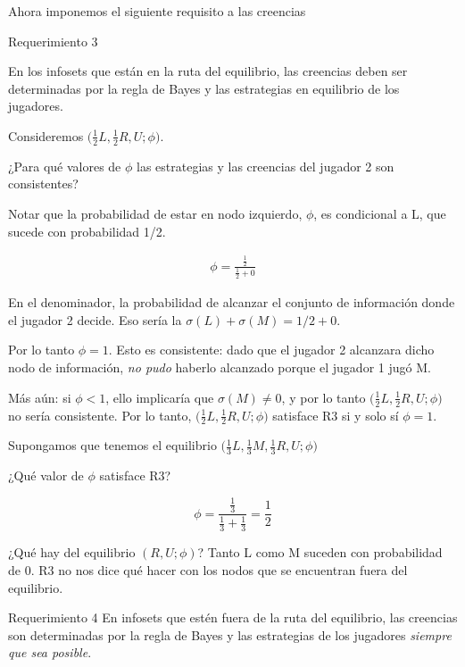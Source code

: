 \documentclass[12pt]{article}
\begin{document}
Ahora imponemos el siguiente requisito a las creencias

\begin{mybox}{Requerimiento 3}

	En los infosets que están en la ruta del equilibrio, las creencias deben ser determinadas por la regla de Bayes y las estrategias en equilibrio de los jugadores.

\end{mybox}

Consideremos $\biggl( \frac{1}{2}L, \frac{1}{2}R, U; \phi \biggr)$.

¿Para qué valores de $ \phi $ las estrategias y las creencias del jugador 2 son consistentes?

Notar que la probabilidad de estar en nodo izquierdo, $ \phi $, es condicional a L, que sucede con probabilidad 1/2.

\begin{align*}
	\phi = \frac{ \frac{1}{2} }{\frac{1}{2} + 0}
\end{align*}

En el denominador, la probabilidad de alcanzar el conjunto de información donde el jugador 2 decide. Eso sería la $ \sigma(L) + \sigma(M) = 1/2 + 0 $.

Por lo tanto $ \phi = 1$. Esto es consistente: dado que el jugador 2 alcanzara dicho nodo de información, \textit{no pudo} haberlo alcanzado porque el jugador 1 jugó M.

Más aún: si $ \phi < 1$, ello implicaría que $ \sigma(M) \neq 0 $, y por lo tanto $\biggl( \frac{1}{2}L, \frac{1}{2}R, U; \phi \biggr)$ no sería consistente. Por lo tanto, $\biggl( \frac{1}{2}L, \frac{1}{2}R, U; \phi \biggr)$ satisface R3 si y solo sí $ \phi = 1 $.

Supongamos que tenemos el equilibrio $\biggl( \frac{1}{3}L, \frac{1}{3}M, \frac{1}{3}R, U; \phi \biggr)$

¿Qué valor de $ \phi $ satisface R3?

\[
	\phi = \frac{\frac{1}{3}}{\frac{1}{3} + \frac{1}{3}} = \frac{1}{2}
\]

¿Qué hay del equilibrio $( R, U; \phi )$? Tanto L como M suceden con probabilidad de 0. R3 no nos dice qué hacer con los nodos que se encuentran fuera del equilibrio.

\begin{mybox}{Requerimiento 4}
	En infosets que estén fuera de la ruta del equilibrio, las creencias son determinadas por la regla de Bayes y las estrategias de los jugadores \textit{siempre que sea posible}.

\end{mybox}
\end{document}
